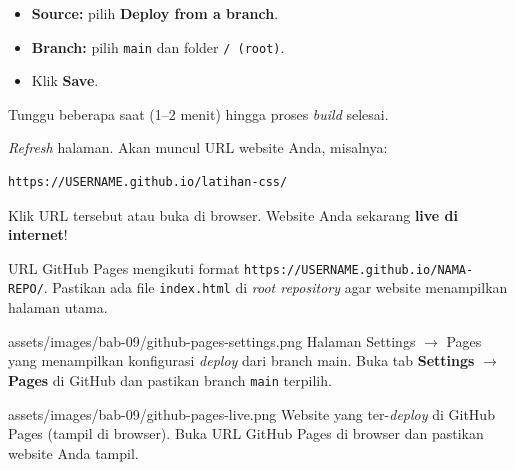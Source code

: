 \begin{itemize}
  \item \textbf{Source:} pilih \textbf{Deploy from a branch}.
  \item \textbf{Branch:} pilih \texttt{main} dan folder \texttt{/ (root)}.
  \item Klik \textbf{Save}.
\end{itemize}

\begin{langkah}
  \item Tunggu beberapa saat (1--2 menit) hingga proses \emph{build} selesai.
  \item \emph{Refresh} halaman. Akan muncul URL website Anda, misalnya:
\end{langkah}

\begin{lstlisting}[caption={Format URL GitHub Pages}, label={lst:url-pages-contoh}]
https://USERNAME.github.io/latihan-css/
\end{lstlisting}

\begin{langkah}
  \item Klik URL tersebut atau buka di browser. Website Anda sekarang \textbf{live di internet}!
\end{langkah}

\begin{catatan}
URL GitHub Pages mengikuti format \texttt{https://USERNAME.github.io/NAMA-REPO/}. Pastikan ada file \texttt{index.html} di \emph{root repository} agar website menampilkan halaman utama.
\end{catatan}

\begin{tangkapanlayar}
  {assets/images/bab-09/github-pages-settings.png}
  {Halaman Settings $\rightarrow$ Pages yang menampilkan konfigurasi \emph{deploy} dari branch main.}
  {Buka tab \textbf{Settings} $\rightarrow$ \textbf{Pages} di GitHub dan pastikan branch \texttt{main} terpilih.}
\end{tangkapanlayar}

\begin{tangkapanlayar}
  {assets/images/bab-09/github-pages-live.png}
  {Website yang ter-\emph{deploy} di GitHub Pages (tampil di browser).}
  {Buka URL GitHub Pages di browser dan pastikan website Anda tampil.}
\end{tangkapanlayar}

